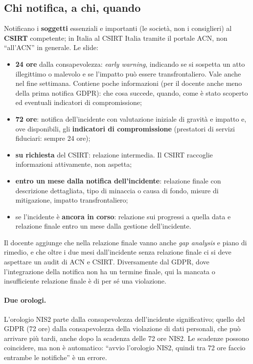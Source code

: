 \subsection{Chi notifica, a chi, quando}
Notificano i \textbf{soggetti} essenziali e importanti (le società, non i consiglieri) al
\textbf{CSIRT} competente; in Italia al CSIRT Italia tramite il portale ACN, non ``all'ACN'' in
generale. Le slide:
\begin{itemize}
  \item \textbf{24 ore} dalla consapevolezza: \emph{early warning}, indicando se si sospetta un atto
    illegittimo o malevolo e se l'impatto può essere transfrontaliero. Vale anche nel fine settimana.
    Contiene poche informazioni (per il docente anche meno della prima notifica GDPR): che cosa
    succede, quando, come è stato scoperto ed eventuali indicatori di compromissione;
  \item \textbf{72 ore}: notifica dell'incidente con valutazione iniziale di gravità e impatto e, ove
    disponibili, gli \textbf{indicatori di compromissione} (prestatori di servizi fiduciari: sempre
    24 ore);
  \item \textbf{su richiesta} del CSIRT: relazione intermedia. Il CSIRT raccoglie informazioni
    attivamente, non aspetta;
  \item \textbf{entro un mese dalla notifica dell'incidente}: relazione finale con descrizione
    dettagliata, tipo di minaccia o causa di fondo, misure di mitigazione, impatto transfrontaliero;
  \item se l'incidente è \textbf{ancora in corso}: relazione sui progressi a quella data e relazione
    finale entro un mese dalla gestione dell'incidente.
\end{itemize}
Il docente aggiunge che nella relazione finale vanno anche \emph{gap analysis} e piano di rimedio, e che
oltre i due mesi dall'incidente senza relazione finale ci si deve aspettare un audit di ACN e CSIRT.
Diversamente dal GDPR, dove l'integrazione della notifica non ha un termine finale, qui la mancata o
insufficiente relazione finale è di per sé una violazione.

\paragraph{Due orologi.} L'orologio NIS2 parte dalla consapevolezza dell'incidente significativo;
quello del GDPR (72 ore) dalla consapevolezza della violazione di dati personali, che può arrivare più
tardi, anche dopo la scadenza delle 72 ore NIS2. Le scadenze possono coincidere, ma non è automatico:
``avvio l'orologio NIS2, quindi tra 72 ore faccio entrambe le notifiche'' è un errore.


